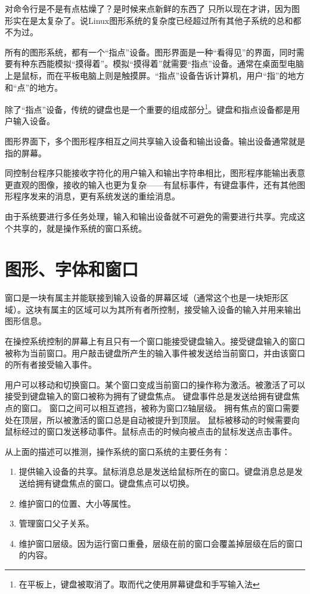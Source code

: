 

对命令行是不是有点枯燥了？是时候来点新鲜的东西了 只所以现在才讲，因为图形实在是太复杂了。说Linux图形系统的复杂度已经超过所有其他子系统的总和都不为过。

所有的图形系统，都有一个“指点”设备。图形界面是一种“看得见”的界面，同时需要有种东西能模拟“摸得着”。模拟“摸得着”就需要“指点”设备。通常在桌面型电脑上是鼠标，而在平板电脑上则是触摸屏。“指点”设备告诉计算机，用户“指”的地方和“点”的地方。

除了“指点”设备，传统的键盘也是一个重要的组成部分\footnote{在平板上，键盘被取消了。取而代之使用屏幕键盘和手写输入法}。键盘和指点设备都是用户输入设备。

图形界面下，多个图形程序相互之间共享输入设备和输出设备。输出设备通常就是指的屏幕。

同控制台程序只能接收字符化的用户输入和输出字符串相比，图形程序能输出表意更直观的图像，接收的输入也更为复杂——有鼠标事件，有键盘事件，还有其他图形程序发来的消息，更有系统发送的重绘消息。

由于系统要进行多任务处理，输入和输出设备就不可避免的需要进行共享。完成这个共享的，就是操作系统的窗口系统。

\section{图形、字体和窗口}

窗口是一块有属主并能联接到输入设备的屏幕区域（通常这个也是一块矩形区域）。这块有属主的区域可以为其所有者所控制，接受输入设备的输入并用来输出图形信息。

在操控系统控制的屏幕上有且只有一个窗口能接受键盘输入。接受键盘输入的窗口被称为当前窗口。用户敲击键盘所产生的输入事件被发送给当前窗口，并由该窗口的所有者接受输入事件。

用户可以移动和切换窗口。某个窗口变成当前窗口的操作称为激活。被激活了可以接受到键盘输入的窗口被称为拥有了键盘焦点。
键盘事件总是发送给拥有键盘焦点的窗口。
窗口之间可以相互遮挡，被称为窗口Z轴层级。
拥有焦点的窗口需要处在顶层，所以被激活的窗口总是自动被提升到顶层。
鼠标被移动的时候需要向鼠标经过的窗口发送移动事件。鼠标点击的时候向被点击的鼠标发送点击事件。

从上面的描述可以推测，操作系统的窗口系统的主要任务有：

\begin{enumerate}

\item	提供输入设备的共享。鼠标消息总是发送给鼠标所在的窗口。键盘消息总是发送给拥有键盘焦点的窗口。键盘焦点可以切换。

\item	维护窗口的位置、大小等属性。

\item	管理窗口父子关系。

\item	维护窗口层级。因为运行窗口重叠，层级在前的窗口会覆盖掉层级在后的窗口的内容。

\end{enumerate}

